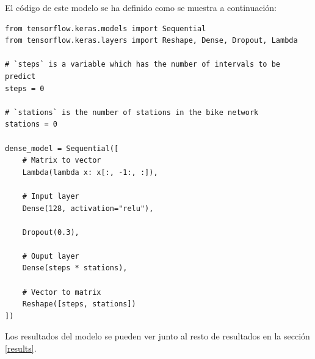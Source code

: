 El código de este modelo se ha definido como se muestra a continuación:

\begin{verbatim}
from tensorflow.keras.models import Sequential
from tensorflow.keras.layers import Reshape, Dense, Dropout, Lambda

# `steps` is a variable which has the number of intervals to be predict
steps = 0 

# `stations` is the number of stations in the bike network
stations = 0

dense_model = Sequential([
    # Matrix to vector
    Lambda(lambda x: x[:, -1:, :]), 
    
    # Input layer
    Dense(128, activation="relu"),

    Dropout(0.3),
    
    # Ouput layer
    Dense(steps * stations),
                  
    # Vector to matrix
    Reshape([steps, stations])
])
\end{verbatim}


Los resultados del modelo se pueden ver junto al resto de resultados en la sección \ref{results}.